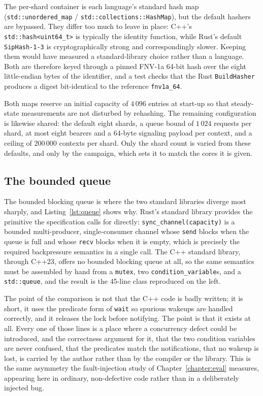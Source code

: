 \documentclass[english,twoside,openright,a4paper,censored,csm,software-track-2020]{HYthesisML}
\begin{document}
The per-shard container is each language's standard hash map (\texttt{std::unordered\_map} /
\texttt{std::collections::HashMap}), but the default hashers are bypassed. They differ too much
to leave in place: C++'s \texttt{std::hash<uint64\_t>} is typically the identity function, while
Rust's default \texttt{SipHash-1-3} is cryptographically strong and correspondingly slower.
Keeping them would have measured a standard-library choice rather than a language. Both are
therefore keyed through a pinned FNV-1a 64-bit hash over the eight little-endian bytes of the
identifier, and a test checks that the Rust \texttt{BuildHasher} produces a digest bit-identical
to the reference \texttt{fnv1a\_64}.

Both maps reserve an initial capacity of $4\,096$ entries at start-up so that steady-state
measurements are not disturbed by rehashing. The remaining configuration is likewise shared:
the default eight shards, a queue bound of
$1\,024$ requests per shard, at most eight bearers and a 64-byte signaling payload per
context, and a ceiling of $200\,000$ contexts per shard. Only the shard count is varied from
these defaults, and only by the campaign, which sets it to match the cores it is given.

\subsection{The bounded queue}
The bounded blocking queue is where the two standard libraries diverge most sharply, and
Listing~\ref{lst:queue} shows why. Rust's standard library provides the primitive the
specification calls for directly: \texttt{sync\_channel(capacity)} is a bounded multi-producer,
single-consumer channel whose \texttt{send} blocks when the queue is full and whose
\texttt{recv} blocks when it is empty, which is precisely the required backpressure semantics
in a single call. The C++ standard library, through C++23, offers no bounded blocking queue at
all, so the same semantics must be assembled by hand from a \texttt{mutex}, two
\texttt{condition\_variable}s, and a \texttt{std::queue}, and the result is the 45-line class
reproduced on the left.

The point of the comparison is not that the C++ code is badly written; it is short, it uses
the predicate form of \texttt{wait} so spurious wakeups are handled correctly, and it releases
the lock before notifying. The point is that it exists at all. Every one of those lines is a
place where a concurrency defect could be introduced, and the correctness argument for it,
that the two condition variables are never confused, that the predicates match the
notifications, that no wakeup is lost, is carried by the author rather than by the compiler or
the library. This is the same asymmetry the fault-injection study of Chapter~\ref{chapter:eval}
measures, appearing here in ordinary, non-defective code rather than in a deliberately injected
bug.
\end{document}
